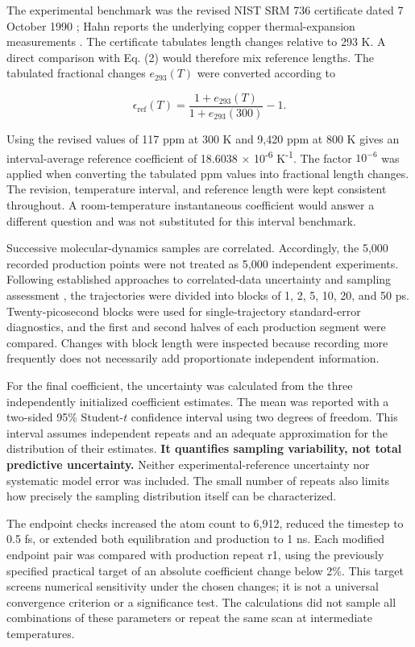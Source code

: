 \documentclass[10pt,a4paper,twocolumn]{article}
\begin{document}
The experimental benchmark was the revised NIST SRM 736 certificate dated 7 October 1990 \cite{r9}; Hahn reports the underlying copper thermal-expansion measurements \cite{r10}. The certificate tabulates length changes relative to 293 K. A direct comparison with Eq. (2) would therefore mix reference lengths. The tabulated fractional changes $e_{293}(T)$ were converted according to


\begin{equation}
\epsilon_{\mathrm{ref}}(T)=\frac{1+e_{293}(T)}{1+e_{293}(300)}-1.\tag{3}
\end{equation}

Using the revised values of 117 ppm at 300 K and 9,420 ppm at 800 K gives an interval-average reference coefficient of 18.6038 × 10\textsuperscript{-6} K\textsuperscript{-1}. The factor $10^{-6}$ was applied when converting the tabulated ppm values into fractional length changes. The revision, temperature interval, and reference length were kept consistent throughout. A room-temperature instantaneous coefficient would answer a different question and was not substituted for this interval benchmark.


Successive molecular-dynamics samples are correlated. Accordingly, the 5,000 recorded production points were not treated as 5,000 independent experiments. Following established approaches to correlated-data uncertainty and sampling assessment \cite{r11,r12}, the trajectories were divided into blocks of 1, 2, 5, 10, 20, and 50 ps. Twenty-picosecond blocks were used for single-trajectory standard-error diagnostics, and the first and second halves of each production segment were compared. Changes with block length were inspected because recording more frequently does not necessarily add proportionate independent information.


For the final coefficient, the uncertainty was calculated from the three independently initialized coefficient estimates. The mean was reported with a two-sided 95\% Student-$t$ confidence interval using two degrees of freedom. This interval assumes independent repeats and an adequate approximation for the distribution of their estimates. \textbf{It quantifies sampling variability, not total predictive uncertainty.} Neither experimental-reference uncertainty nor systematic model error was included. The small number of repeats also limits how precisely the sampling distribution itself can be characterized.


The endpoint checks increased the atom count to 6,912, reduced the timestep to 0.5 fs, or extended both equilibration and production to 1 ns. Each modified endpoint pair was compared with production repeat r1, using the previously specified practical target of an absolute coefficient change below 2\%. This target screens numerical sensitivity under the chosen changes; it is not a universal convergence criterion or a significance test. The calculations did not sample all combinations of these parameters or repeat the same scan at intermediate temperatures.
\end{document}
